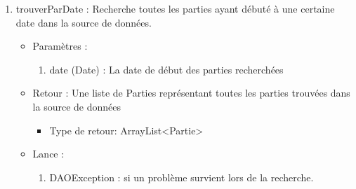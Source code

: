 \begin{itemize}
\begin{enumerate}
  \item trouverParDate : Recherche toutes les parties ayant débuté à une certaine date dans la source de données.
    \begin{itemize}
    \item Paramètres : 
      \begin{enumerate}
      \item date (Date) : La date de début des parties recherchées
      \end{enumerate}
    \item Retour : Une liste de Parties représentant toutes les parties trouvées dans la source de données
      \begin{itemize}
      \item Type de retour: ArrayList<Partie>
      \end{itemize}
    \item Lance :
      \begin{enumerate}
      \item DAOException : si un problème survient lors de la recherche.
      \end{enumerate}
    \end{itemize}
    
  \end{enumerate}

\end{itemize}

